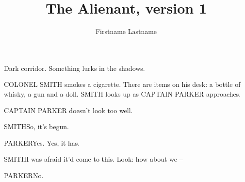 \documentclass{screenplay}
\title{The Alienant, version 1}
\author{Firstname Lastname}
\begin{document}
\coverpage
\fadein
{}

Dark corridor. Something lurks in the shadows.


COLONEL SMITH smokes a cigarette. There are items on his desk: a bottle of whisky, a gun and a doll. SMITH looks up as CAPTAIN PARKER approaches.

CAPTAIN PARKER doesn't look too well.

\begin{dialogue}{SMITH}So, it's begun.\end{dialogue}

\begin{dialogue}{PARKER}Yes.  Yes, it has.\end{dialogue}

\begin{dialogue}{SMITH}I was afraid it'd come to this. Look: how about we –\end{dialogue}

\begin{dialogue}{PARKER}No.\end{dialogue}

\fadeout
\theend
\end{document}
